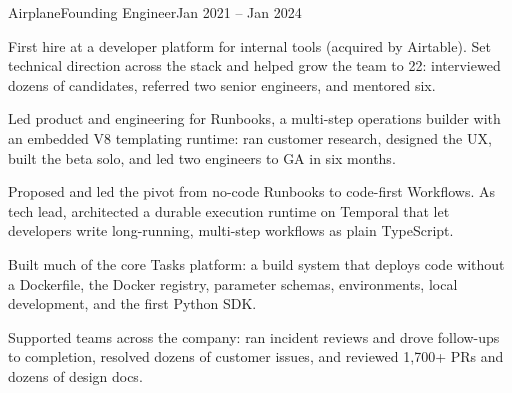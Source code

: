 \documentclass{resume}
\begin{document}
\begin{role}{Airplane}{Founding Engineer}{Jan 2021 -- Jan 2024}
\item First hire at a developer platform for internal tools (acquired by Airtable). Set technical direction across the stack and helped grow the team to 22: interviewed dozens of candidates, referred two senior engineers, and mentored six.
\item Led product and engineering for Runbooks, a multi-step operations builder with an embedded V8 templating runtime: ran customer research, designed the UX, built the beta solo, and led two engineers to GA in six months.
\item Proposed and led the pivot from no-code Runbooks to code-first Workflows. As tech lead, architected a durable execution runtime on Temporal that let developers write long-running, multi-step workflows as plain TypeScript.
\item Built much of the core Tasks platform: a build system that deploys code without a Dockerfile, the Docker registry, parameter schemas, environments, local development, and the first Python SDK.
\item Supported teams across the company: ran incident reviews and drove follow-ups to completion, resolved dozens of customer issues, and reviewed 1,700+ PRs and dozens of design docs.
\end{role}
\end{document}
